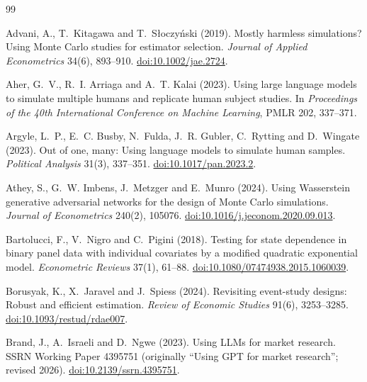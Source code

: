 \documentclass[11pt]{article}
\begin{document}
\begin{thebibliography}{99}
\setlength{\itemsep}{1pt}\small

Advani, A., T.~Kitagawa and T.~S{\l}oczy{\'n}ski (2019).
Mostly harmless simulations? {U}sing {M}onte {C}arlo studies for estimator selection.
\emph{Journal of Applied Econometrics} 34(6), 893--910.
\href{https://doi.org/10.1002/jae.2724}{doi:10.1002/jae.2724}.

Aher, G.~V., R.~I. Arriaga and A.~T. Kalai (2023).
Using large language models to simulate multiple humans and replicate human subject studies.
In \emph{Proceedings of the 40th International Conference on Machine Learning}, PMLR 202,
337--371.

Argyle, L.~P., E.~C. Busby, N.~Fulda, J.~R. Gubler, C.~Rytting and D.~Wingate (2023).
Out of one, many: Using language models to simulate human samples.
\emph{Political Analysis} 31(3), 337--351.
\href{https://doi.org/10.1017/pan.2023.2}{doi:10.1017/pan.2023.2}.

Athey, S., G.~W. Imbens, J.~Metzger and E.~Munro (2024).
Using {W}asserstein generative adversarial networks for the design of {M}onte {C}arlo simulations.
\emph{Journal of Econometrics} 240(2), 105076.
\href{https://doi.org/10.1016/j.jeconom.2020.09.013}{doi:10.1016/j.jeconom.2020.09.013}.

Bartolucci, F., V.~Nigro and C.~Pigini (2018).
Testing for state dependence in binary panel data with individual covariates by a modified
quadratic exponential model.
\emph{Econometric Reviews} 37(1), 61--88.
\href{https://doi.org/10.1080/07474938.2015.1060039}{doi:10.1080/07474938.2015.1060039}.

Borusyak, K., X.~Jaravel and J.~Spiess (2024).
Revisiting event-study designs: Robust and efficient estimation.
\emph{Review of Economic Studies} 91(6), 3253--3285.
\href{https://doi.org/10.1093/restud/rdae007}{doi:10.1093/restud/rdae007}.

Brand, J., A.~Israeli and D.~Ngwe (2023).
Using {LLM}s for market research. SSRN Working Paper 4395751 (originally ``Using GPT for market
research''; revised 2026).
\href{https://doi.org/10.2139/ssrn.4395751}{doi:10.2139/ssrn.4395751}.


\end{thebibliography}
\end{document}
